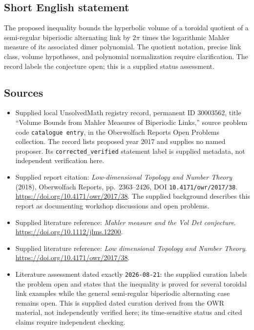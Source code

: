 \documentclass[11pt]{article}
\begin{document}
\subsection{Short English statement}
The proposed inequality bounds the hyperbolic volume of a toroidal quotient of a semi-regular biperiodic alternating link by \(2\pi\) times the logarithmic Mahler measure of its associated dimer polynomial. The quotient notation, precise link class, volume hypotheses, and polynomial normalization require clarification. The record labels the conjecture open; this is a supplied status assessment.
\subsection{Sources}
\begin{itemize}
\item Supplied local UnsolvedMath registry record, permanent ID \(30003562\), title ``Volume Bounds from Mahler Measures of Biperiodic Links,'' source problem code \texttt{catalogue entry}, in the Oberwolfach Reports Open Problems collection. The record lists proposed year 2017 and supplies no named proposer. Its \texttt{corrected\_verified} statement label is supplied metadata, not independent verification here.
\item Supplied report citation: \emph{Low-dimensional Topology and Number Theory} (2018), Oberwolfach Reports, pp.~2363--2426, DOI \texttt{10.4171/owr/2017/38}. \url{https://doi.org/10.4171/owr/2017/38}. The supplied background describes this report as documenting workshop discussions and open problems.
\item Supplied literature reference: \emph{Mahler measure and the Vol Det conjecture}. \url{https://doi.org/10.1112/jlms.12200}.
\item Supplied literature reference: \emph{Low dimensional Topology and Number Theory}. \url{https://doi.org/10.4171/owr/2017/38}.
\item Literature assessment dated exactly \texttt{2026-08-21}: the supplied curation labels the problem open and states that the inequality is proved for several toroidal link examples while the general semi-regular biperiodic alternating case remains open. This is supplied dated curation derived from the OWR material, not independently verified here; its time-sensitive status and cited claims require independent checking.
\end{itemize}
\end{document}
